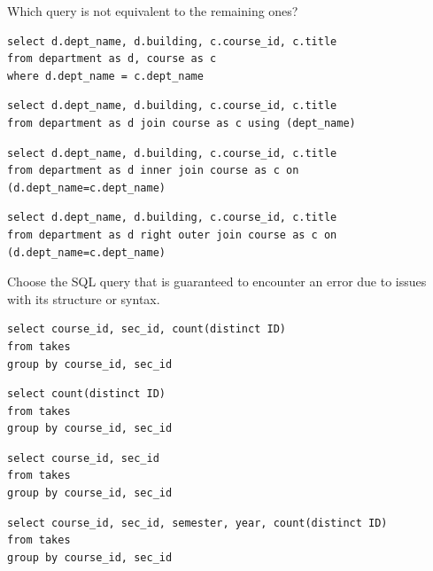 \documentclass[12pt]{exam}
\begin{document}
\begin{questions}
\question[4]
Which query is not equivalent to the remaining ones?\par\vspace{0.5em}
\begin{choices} 
    \choice \begin{verbatim}
select d.dept_name, d.building, c.course_id, c.title
from department as d, course as c
where d.dept_name = c.dept_name
    \end{verbatim}
    \choice \begin{verbatim}
select d.dept_name, d.building, c.course_id, c.title
from department as d join course as c using (dept_name)
    \end{verbatim}
    \choice \begin{verbatim}
select d.dept_name, d.building, c.course_id, c.title
from department as d inner join course as c on (d.dept_name=c.dept_name)
    \end{verbatim}
    \CorrectChoice \begin{verbatim}
select d.dept_name, d.building, c.course_id, c.title
from department as d right outer join course as c on (d.dept_name=c.dept_name)
    \end{verbatim}
\end{choices}

\question[4]
Choose the SQL query that is guaranteed to encounter an error due to issues with its structure or syntax.\par\vspace{0.5em}
\begin{choices} 
    \choice \begin{verbatim}
select course_id, sec_id, count(distinct ID)
from takes
group by course_id, sec_id
    \end{verbatim}
    \choice \begin{verbatim}
select count(distinct ID)
from takes
group by course_id, sec_id
    \end{verbatim}
    \choice \begin{verbatim}
select course_id, sec_id
from takes
group by course_id, sec_id
    \end{verbatim}
    \CorrectChoice \begin{verbatim}
select course_id, sec_id, semester, year, count(distinct ID)
from takes
group by course_id, sec_id
    \end{verbatim}
\end{choices}



\end{questions}
\end{document}
